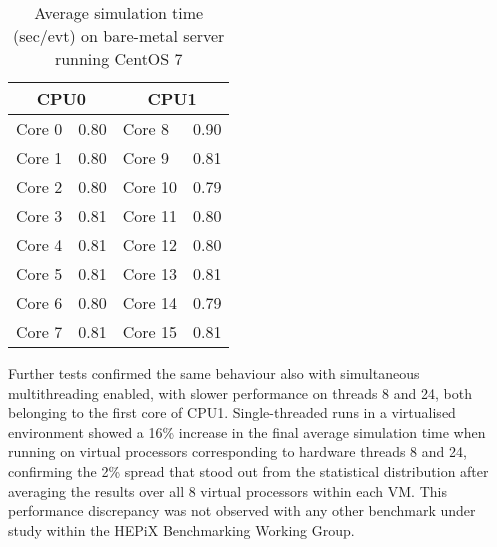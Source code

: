 \documentclass[a4paper]{jpconf}
\begin{document}

\begin{wraptable}{l}{0.35\linewidth}
    \vspace{-3mm}
    \caption{Average simulation time \newline (sec/evt) on bare-metal server \newline 
             running CentOS 7}
    \label{table:simulation-time-cores}
    \begin{tabular}{ |l |  l  || l | l|}
        \hline
        \multicolumn{2}{|c||}{CPU0} & \multicolumn{2}{|c|}{CPU1} \\
        \hline
         Core 0  & 0.80 & Core 8  & 0.90\\
        \hline
         Core 1  & 0.80 & Core 9  & 0.81\\
        \hline
         Core 2  & 0.80 & Core 10  & 0.79\\
        \hline
         Core 3  & 0.81 & Core 11  & 0.80\\
        \hline
         Core 4  & 0.81 & Core 12  & 0.80\\
        \hline
         Core 5  & 0.81 & Core 13  & 0.81\\
        \hline
         Core 6  & 0.80 & Core 14 & 0.79\\
        \hline
        Core 7  & 0.81 & Core 15  & 0.81\\
        \hline
    \end{tabular}
    \vspace{-7mm}
\end{wraptable}
Further tests confirmed the same behaviour also with simultaneous multithreading
enabled, with slower performance on threads 8 and 24, both belonging to the first core of
CPU1. Single-threaded runs in a virtualised environment showed a 16\%
increase in the final average simulation time when running on virtual processors
corresponding to hardware threads 8 and 24, confirming the 2\%
spread that stood out from the statistical distribution after averaging the results
over all 8 virtual processors within each VM. This performance discrepancy
was not observed with any other benchmark under study within the HEPiX Benchmarking
Working Group.
\end{document}
